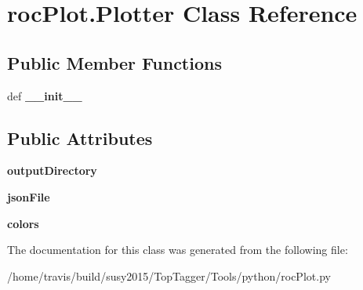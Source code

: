 \hypertarget{classrocPlot_1_1Plotter}{\section{roc\-Plot.\-Plotter Class Reference}
\label{classrocPlot_1_1Plotter}
}
\subsection*{Public Member Functions}
\begin{DoxyCompactItemize}
\item 
\hypertarget{classrocPlot_1_1Plotter_a3340e985d0711bb2a87483b329abbd1e}{def {\bfseries \-\_\-\-\_\-init\-\_\-\-\_\-}}\label{classrocPlot_1_1Plotter_a3340e985d0711bb2a87483b329abbd1e}

\end{DoxyCompactItemize}
\subsection*{Public Attributes}
\begin{DoxyCompactItemize}
\item 
\hypertarget{classrocPlot_1_1Plotter_ae2e857d10e07a3acf5e5ab88812ed908}{{\bfseries output\-Directory}}\label{classrocPlot_1_1Plotter_ae2e857d10e07a3acf5e5ab88812ed908}

\item 
\hypertarget{classrocPlot_1_1Plotter_a4662c882aa24d845e93f369b5951ddaf}{{\bfseries json\-File}}\label{classrocPlot_1_1Plotter_a4662c882aa24d845e93f369b5951ddaf}

\item 
\hypertarget{classrocPlot_1_1Plotter_a9df7daadc166d1c230ca4821a1c0de96}{{\bfseries colors}}\label{classrocPlot_1_1Plotter_a9df7daadc166d1c230ca4821a1c0de96}

\end{DoxyCompactItemize}


The documentation for this class was generated from the following file\-:\begin{DoxyCompactItemize}
\item 
/home/travis/build/susy2015/\-Top\-Tagger/\-Tools/python/roc\-Plot.\-py\end{DoxyCompactItemize}
